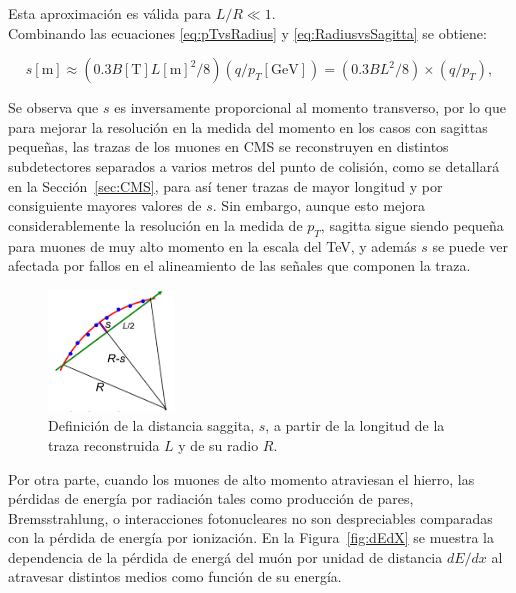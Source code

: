 Esta aproximaci\'on es v\'alida para $L/R \ll 1$. \\

Combinando las ecuaciones \eqref{eq:pTvsRadius} y \eqref{eq:RadiusvsSagitta} se obtiene:

\begin{equation}
  s[\text{m}]\approx (0.3 B [\text{T}] L[\text{m}]^{2}/8) (q/p_{T}[\text{GeV}]) =  (0.3 BL^{2}/8) \times (q/p_{T}),
\label{eq:SagittavsPt}
\end{equation}

Se observa que $s$ es inversamente proporcional al momento transverso, por lo que para mejorar la resoluci\'on en la medida del momento en los casos con sagittas peque\~nas, las trazas de los muones en CMS se reconstruyen en distintos subdetectores separados a varios metros del punto de colisi\'on, como se detallar\'a en la Secci\'on~\ref{sec:CMS}, para as\'i tener trazas de mayor longitud y por consiguiente mayores valores de $s$. Sin embargo, aunque esto mejora considerablemente la resoluci\'on en la medida de $p_{T}$, sagitta sigue siendo peque\~na para muones de muy alto momento en la escala del TeV, y adem\'as $s$ se puede ver afectada por fallos en el alineamiento de las se\~nales que componen la traza. \\

\begin{figure}[h]
\centering
\includegraphics[width=0.30\textwidth]{figures/curvaturesketch.png}
\caption{Definici\'on de la distancia saggita, $s$, a partir de la longitud de la traza reconstruida $L$ y de su radio $R$.}
\label{fig:SagittaDef}
\end{figure}

Por otra parte, cuando los muones de alto momento atraviesan el hierro, las p\'erdidas de energ\'ia por radiaci\'on tales como producci\'on de pares, Bremsstrahlung, o interacciones fotonucleares no son despreciables comparadas con la p\'erdida de energ\'ia por ionizaci\'on. En la Figura~\ref{fig:dEdX} se muestra la dependencia de la p\'erdida de energ\'a del mu\'on por unidad de distancia $dE/dx$ al atravesar distintos medios como funci\'on de su energ\'ia.

